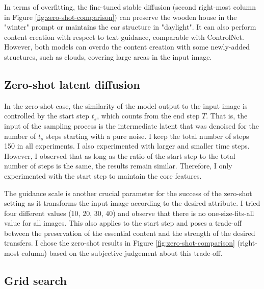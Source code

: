 In terms of overfitting, the fine-tuned stable diffusion (second right-most column in Figure \ref{fig:zero-shot-comparison}) can preserve the wooden house in the "winter" prompt or maintains the car structure in "daylight". It can also perform content creation with respect to text guidance, comparable with ControlNet. However, both models can overdo the content creation with some newly-added structures, such as clouds, covering large areas in the input image.

\subsection{Zero-shot latent diffusion}
In the zero-shot case, the similarity of the model output to the input image is controlled by the start step $t_s$, which counts from the end step $T$. That is, the input of the sampling process is the intermediate latent that was denoised for the number of $t_s$ steps starting with a pure noise. I keep the total number of steps 150 in all experiments. I also experimented with larger and smaller time steps. However, I observed that as long as the ratio of the start step to the total number of steps is the same, the results remain similar. Therefore, I only experimented with the start step to maintain the core features.

The guidance scale is another crucial parameter for the success of the zero-shot setting as it transforms the input image according to the desired attribute. I tried four different values (10, 20, 30, 40) and observe that there is no one-size-fits-all value for all images. This also applies to the start step and poses a trade-off between the preservation of the essential content and the strength of the desired transfers. I chose the zero-shot results in Figure \ref{fig:zero-shot-comparison} (right-most column) based on the subjective judgement about this trade-off.


\subsection{Grid search}

